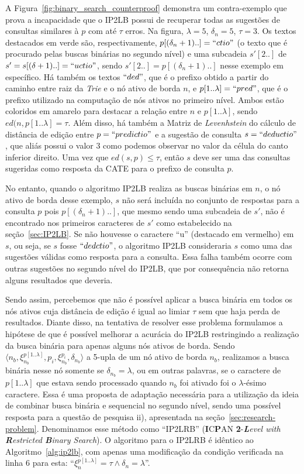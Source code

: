 A Figura~\ref{fig:binary_search_counterproof} demonstra um contra-exemplo que prova a incapacidade que o IP2LB possui de recuperar todas as sugestões de consultas similares à $p$ com até $\tau$ erros. Na figura, $\lambda = 5$, $\delta_{n}=5$, $\tau=3$. Os textos destacados em verde são, respectivamente, $p[(\delta_{n}+1)..]=``ctio"$ (o texto que é procurado pelas buscas binárias no segundo nível) e uma subcadeia $s'[2..]$ de  $s'=s[(\delta+1)..]=``uctio"$, sendo $s'[2..] = p[(\delta_{n}+1)..]$ nesse exemplo em específico. Há também os textos $``ded"$, que é o prefixo obtido a partir do caminho entre raiz da \textit{Trie} e o nó ativo de borda $n$, e $p[1..\lambda] = ``pred"$, que é o prefixo utilizado na computação de nós ativos no primeiro nível. Ambos estão coloridos em amarelo para destacar a relação entre $n$ e $p[1..\lambda]$, sendo $ed(n, p[1..\lambda] = \tau$. Além disso, há também a Matriz de \textit{Levenhstein} do cálculo de distância de edição entre $p=``predictio"$ e a sugestão de consulta $s=``deductio"$, que aliás possui o valor $3$ como podemos observar no valor da célula do canto inferior direito. Uma vez que $ed(s, p) \leq \tau$, então $s$ deve ser uma das consultas sugeridas como resposta da CATE para o prefixo de consulta $p$.

No entanto, quando o algoritmo IP2LB realiza as buscas binárias em $n$, o nó ativo de borda desse exemplo, $s$ não será incluída no conjunto de respostas para a consulta $p$ pois $p[(\delta_{n}+1)..]$, que mesmo sendo uma subcadeia de $s'$, não é encontrado nos primeiros caracteres de $s'$ como estabelecido na seção~\ref{sec:IP2LB}. Se não houvesse o caractere ``u'' (destacado em vermelho) em $s$, ou seja, se $s$ fosse $``dedctio"$, o algoritmo IP2LB consideraria $s$ como uma das sugestões válidas como resposta para a consulta. Essa falha também ocorre com outras sugestões no segundo nível do IP2LB, que por consequência não retorna alguns resultados que deveria.

Sendo assim, percebemos que não é possível aplicar a busca binária em todos os nós ativos cuja distância de edição é igual ao limiar $\tau$ sem que haja perda de resultados. Diante disso, na tentativa de resolver esse problema formulamos a hipótese de que é possível melhorar a acurácia do IP2LB restringindo a realização da busca binária para apenas alguns nós ativos de borda. Sendo $\langle n_{b}, \xi_{n_{b}}^{p[1..\lambda]}, p_{i}, \xi_{n_{b}}^{p_{i}}, \delta_{n_{b}} \rangle$ a 5-upla de um nó ativo de borda $n_b$, realizamos a busca binária nesse nó somente se $\delta_{n_{b}} = \lambda$, ou em outras palavras, se o caractere de $p[1..\lambda]$ que estava sendo processado quando $n_{b}$ foi ativado foi o $\lambda$-ésimo caractere. Essa é uma proposta de adaptação necessária para a utilização da ideia de combinar busca binária e sequencial no segundo nível, sendo uma possível resposta para a questão de pesquisa ii), apresentada na seção~\ref{sec:research-problem}. Denominamos esse método como ``IP2LRB'' (\textbf{I}C\textbf{P}AN \textbf{2}-\textit{\textbf{L}evel with \textbf{R}estricted \textbf{B}inary Search}). O algoritmo para o IP2LRB é idêntico ao Algoritmo~\ref{alg:ip2lb}, com apenas uma modificação da condição verificada na linha 6 para esta: ``$\xi_{n}^{p[1..\lambda]} = \tau \land \delta_{n} = \lambda$''.

